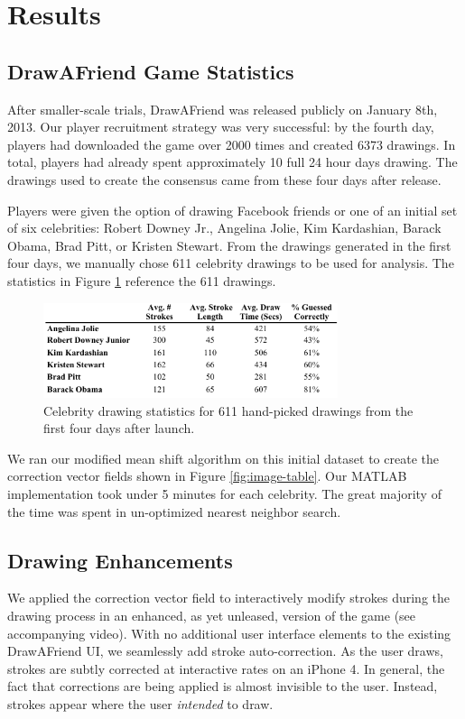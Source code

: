 \section{Results}

\subsection{DrawAFriend Game Statistics}

After smaller-scale trials, DrawAFriend was released publicly on January 8th, 2013. Our player recruitment strategy was very successful: by the fourth day, players had downloaded the game over 2000 times and created 6373 drawings. In total, players had already spent approximately 10 full 24 hour days drawing. The drawings used to create the consensus came from these four days after release.

Players were given the option of drawing Facebook friends or one of an initial set of six celebrities: Robert Downey Jr., Angelina Jolie, Kim Kardashian, Barack Obama, Brad Pitt, or Kristen Stewart. From the drawings generated in the first four days, we manually chose 611 celebrity drawings to be used for analysis. The statistics in Figure \ref{fig:daf-stats} reference the 611 drawings.

\begin{figure}[b]
  \centering%
\includegraphics[height=1.1in]{./figures/daf-stats-cropped.pdf}
  \caption{Celebrity drawing statistics for 611 hand-picked drawings from the first four days after launch.}
  \label{fig:daf-stats}
\end{figure}

We ran our modified mean shift algorithm on this initial dataset to create the correction vector fields shown in Figure \ref{fig:image-table}. Our MATLAB implementation took under 5 minutes for each celebrity. The great majority of the time was spent in un-optimized nearest neighbor search.

\subsection {Drawing Enhancements}

We applied the correction vector field to interactively modify strokes during the drawing process in an enhanced, as yet unleased, version of the game (see accompanying video). With no additional user interface elements to the existing DrawAFriend UI, we seamlessly add stroke auto-correction. As the user draws, strokes are subtly corrected at interactive rates on an iPhone 4. In general, the fact that corrections are being applied is almost invisible to the user. Instead, strokes appear where the user {\em intended} to draw.

